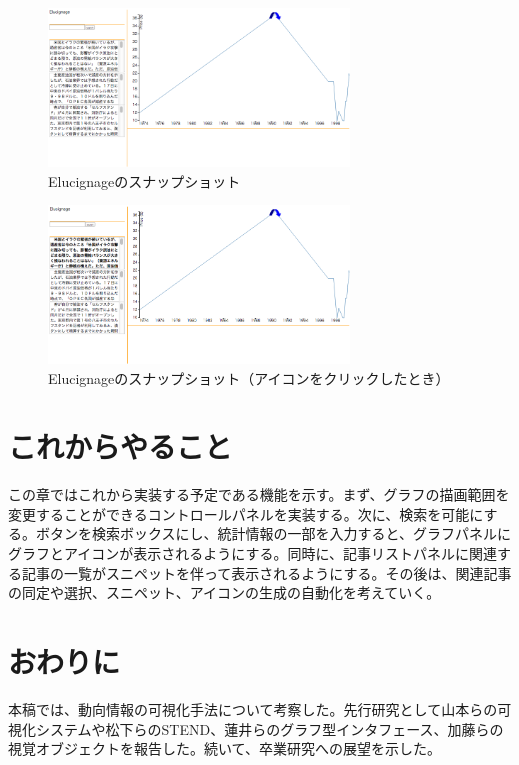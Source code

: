 \documentclass{matsushita-zemi}
\begin{document}
\begin{figure}[tb]
  \begin{center}
   \includegraphics[width=8cm,bb=0 0 852 448]{Elucignageprototype.png}
  \end{center}
 \caption{Elucignageのスナップショット}
 \label{Elucignage}
\end{figure}
\begin{figure}[tb]
  \begin{center}
   \includegraphics[width=8cm,bb=0 0 853 448]{Elucignage_click.png}
  \end{center}
 \caption{Elucignageのスナップショット（アイコンをクリックしたとき）}
 \label{Elucignage_click}
\end{figure}

\section{これからやること}
この章ではこれから実装する予定である機能を示す。まず、グラフの描画範囲を変更することができるコントロールパネルを実装する。次に、検索を可能にする。ボタンを検索ボックスにし、統計情報の一部を入力すると、グラフパネルにグラフとアイコンが表示されるようにする。同時に、記事リストパネルに関連する記事の一覧がスニペットを伴って表示されるようにする。その後は、関連記事の同定や選択、スニペット、アイコンの生成の自動化を考えていく。


\section{おわりに}
本稿では、動向情報の可視化手法について考察した。先行研究として山本らの可視化システムや松下らのSTEND、蓮井らのグラフ型インタフェース、加藤らの視覚オブジェクトを報告した。続いて、卒業研究への展望を示した。



\end{document}
